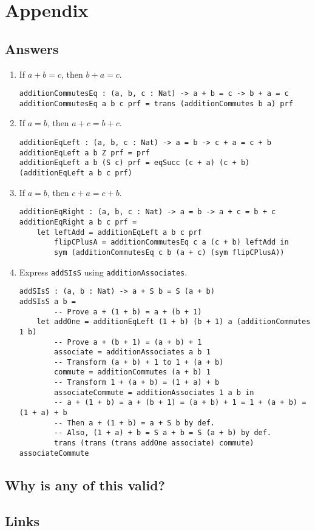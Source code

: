\documentclass{article}
\newcommand{\inline}[1]{\texttt{#1}}
\begin{document}
\section{Appendix}

\subsection{Answers}

\begin{enumerate}
    \item If $a + b = c$, then $b + a = c$.

\begin{verbatim}
additionCommutesEq : (a, b, c : Nat) -> a + b = c -> b + a = c
additionCommutesEq a b c prf = trans (additionCommutes b a) prf
\end{verbatim}

    \item If $a = b$, then $a + c = b + c$.

\begin{verbatim}
additionEqLeft : (a, b, c : Nat) -> a = b -> c + a = c + b
additionEqLeft a b Z prf = prf
additionEqLeft a b (S c) prf = eqSucc (c + a) (c + b) (additionEqLeft a b c prf)
\end{verbatim}

    \item If $a = b$, then $c + a = c + b$.

\begin{verbatim}
additionEqRight : (a, b, c : Nat) -> a = b -> a + c = b + c
additionEqRight a b c prf =
    let leftAdd = additionEqLeft a b c prf
        flipCPlusA = additionCommutesEq c a (c + b) leftAdd in
        sym (additionCommutesEq c b (a + c) (sym flipCPlusA))
\end{verbatim}

    \item Express \inline{addSIsS} using \inline{additionAssociates}.


\begin{verbatim}
addSIsS : (a, b : Nat) -> a + S b = S (a + b)
addSIsS a b =
        -- Prove a + (1 + b) = a + (b + 1)
    let addOne = additionEqLeft (1 + b) (b + 1) a (additionCommutes 1 b)
        -- Prove a + (b + 1) = (a + b) + 1
        associate = additionAssociates a b 1
        -- Transform (a + b) + 1 to 1 + (a + b)
        commute = additionCommutes (a + b) 1
        -- Transform 1 + (a + b) = (1 + a) + b
        associateCommute = additionAssociates 1 a b in
        -- a + (1 + b) = a + (b + 1) = (a + b) + 1 = 1 + (a + b) = (1 + a) + b
        -- Then a + (1 + b) = a + S b by def.
        -- Also, (1 + a) + b = S a + b = S (a + b) by def.
        trans (trans (trans addOne associate) commute) associateCommute
\end{verbatim}

\end{enumerate}

\subsection{Why is any of this valid?}

\subsection{Links}
\end{document}
